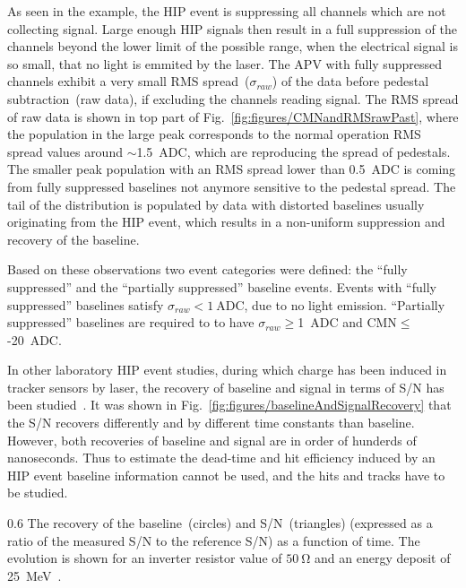 As seen in the example, the HIP event is suppressing all channels which are not collecting signal. Large enough HIP signals then result in a full suppression of the channels beyond the lower limit of the possible range, when the electrical signal is so small, that no light is emmited by the laser. The APV with fully suppressed channels exhibit a very small RMS spread~($\sigma_{raw}$) of the data before pedestal subtraction~(raw data), if excluding the channels reading signal. The RMS spread of raw data is shown in top part of Fig.~\ref{fig:figures/CMNandRMSrawPast}, where the population in the large peak corresponds to the normal operation RMS spread values around $\sim$1.5~ADC, which are reproducing the spread of pedestals. The smaller peak population with an RMS spread lower than 0.5~ADC is coming from fully suppressed baselines not anymore sensitive to the pedestal spread. The tail of the distribution is populated by data with distorted baselines usually originating from the HIP event, which results in a non-uniform suppression and recovery of the baseline.

Based on these observations two event categories were defined: the ``fully suppressed'' and the ``partially suppressed'' baseline events. Events with ``fully suppressed'' baselines satisfy $\sigma_{raw}< 1~\mathrm{ADC}$, due to no light emission. ``Partially suppressed'' baselines are required to to have $\sigma_{raw}\geq$1~ADC and CMN$\leq$-20~ADC.

In other laboratory HIP event studies, during which charge has been induced in tracker sensors by laser, the recovery of baseline and signal in terms of S/N has been studied~\cite{Adam:2005pz}. It was shown in Fig.~\ref{fig:figures/baselineAndSignalRecovery} that the S/N recovers differently and by different time constants than baseline. However, both recoveries of baseline and signal are in order of hunderds of nanoseconds. Thus to estimate the dead-time and hit efficiency induced by an HIP event baseline information cannot be used, and the hits and tracks have to be studied.

                 {0.6}       %
                 {The recovery of the baseline~(circles) and S/N~(triangles) (expressed as a ratio of the measured S/N to the reference S/N) as a function of time. The evolution is shown for an inverter resistor value of $50~\mathrm{\Omega}$ and an energy deposit of 25~MeV~\cite{Adam:2005pz}.} %

